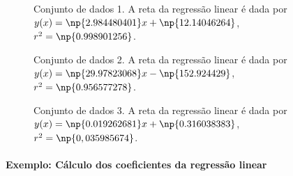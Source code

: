 \begin{figure}[!h]\forcerectofloat
\centering

\caption{Conjunto de dados 1. A reta da regressão linear é dada por $y(x)=\np{2.984480401}x + \np{12.14046264}$, $r^2 = \np{0.998901256}$.}
\label{RetasConjuntosDados1}
\end{figure}

\begin{figure}[!h]\forcerectofloat
\centering

\caption{Conjunto de dados 2. A reta da regressão linear é dada por $y(x)=\np{29.97823068} x - \np{152.924429}$, $r^2=\np{0.956577278}$.}
\label{RetasConjuntosDados2}
\end{figure}

\begin{figure}[!h]\forcerectofloat
\centering

\caption{Conjunto de dados 3. A reta da regressão linear é dada por $y(x)=\np{0.019262681} x + \np{0.316038383}$, $r^2=\np{0,035985674}$.}
\label{RetasConjuntosDados3}
\end{figure}

\vfill
\pagebreak
\paragraph{Exemplo: Cálculo dos coeficientes da regressão linear}

